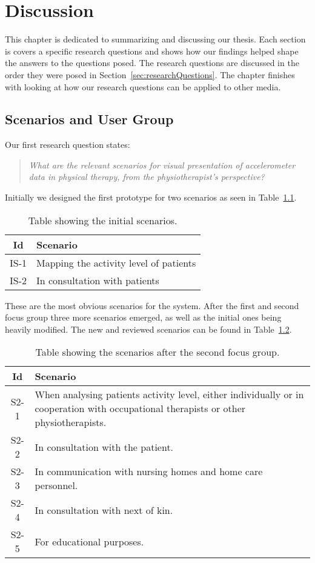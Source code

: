 \chapter{Discussion}
\label{ch:discussion}
This chapter is dedicated to summarizing and discussing our thesis. Each section is covers a specific research questions and shows how our findings helped shape the answers to the questions posed. The research questions are discussed in the order they were posed in Section~\ref{sec:researchQuestions}. The chapter finishes with looking at how our research questions can be applied to other media.

\section{Scenarios and User Group}
Our first research question states:
\begin{quote}
\textit{What are the relevant scenarios for visual presentation of accelerometer data in physical therapy, from the physiotherapist's perspective?}
\end{quote}

Initially we designed the first prototype for two scenarios as seen in Table~\ref{tab:intialRequirementsD}.

\begin{table}[h!]
  \begin{tabular}{|c|p{10cm}|}
    \hline
    \textbf{Id} & \textbf{Scenario} \\ \hline
    IS-1 & Mapping the activity level of patients \\ \hline
    IS-2 & In consultation with patients \\ \hline
  \end{tabular}
  \caption[Initial scenarios.]{Table showing the initial scenarios.}
  \label{tab:intialRequirementsD}
\end{table}

These are the most obvious scenarios for the system. After the first and second focus group three more scenarios emerged, as well as the initial ones being heavily modified. The new and reviewed scenarios can be found in Table~\ref{tab:scenariosFinal1}.

\begin{table}[h!]
  \begin{tabular}{|c|p{10cm}|}
    \hline
    \textbf{Id} & \textbf{Scenario} \\ \hline
    S2-1 & When analysing patients activity level, either individually or in cooperation with occupational therapists or other physiotherapists. \\ \hline
    S2-2 & In consultation with the patient. \\ \hline
    S2-3 & In communication with nursing homes and home care personnel. \\ \hline
    S2-4 & In consultation with next of kin. \\ \hline
    S2-5 & For educational purposes. \\ \hline
  \end{tabular}
  \caption[Scenarios after the second focus group.]{Table showing the scenarios after the second focus group.}
  \label{tab:scenariosFinal1}
\end{table}

